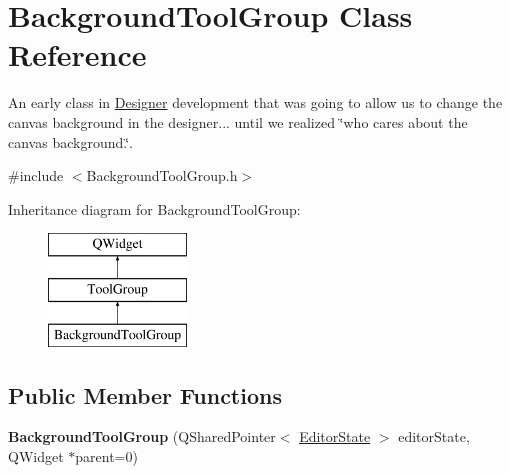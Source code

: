 \hypertarget{class_background_tool_group}{\section{Background\-Tool\-Group Class Reference}
\label{class_background_tool_group}
}


An early class in \hyperlink{class_designer}{Designer} development that was going to allow us to change the canvas background in the designer... until we realized \char`\"{}who cares about the canvas background.\char`\"{}.  




{\ttfamily \#include $<$Background\-Tool\-Group.\-h$>$}

Inheritance diagram for Background\-Tool\-Group\-:\begin{figure}[H]
\begin{center}
\leavevmode
\includegraphics[height=3.000000cm]{class_background_tool_group}
\end{center}
\end{figure}
\subsection*{Public Member Functions}
\begin{DoxyCompactItemize}
\item 
\hypertarget{class_background_tool_group_aa9d3e6979f249c5de5136b8568cad42e}{{\bfseries Background\-Tool\-Group} (Q\-Shared\-Pointer$<$ \hyperlink{class_editor_state}{Editor\-State} $>$ editor\-State, Q\-Widget $\ast$parent=0)}\label{class_background_tool_group_aa9d3e6979f249c5de5136b8568cad42e}

\end{DoxyCompactItemize}
